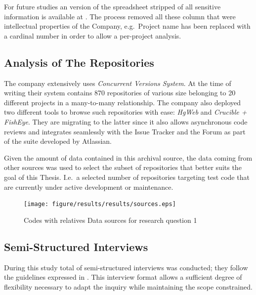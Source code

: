 


For future studies an version of the spreadsheet stripped of all sensitive information is available at . The process removed all these column that were intellectual properties of the Company, e.g.\ Project name has been replaced with a cardinal number in order to allow a per-project analysis.


\subsection{Analysis of The Repositories} \label{sec:analysis_of_the_repos}
The company extensively uses \textit{Concurrent Versions System}. At the time of writing their system contains 870 repositories of various size belonging to 20 different projects in a many-to-many relationship. The company also deployed two different tools to browse such repositories with ease: \textit{HgWeb} and \textit{Crucible + FishEye}. They are migrating to the latter since it also allows asynchronous code reviews and integrates seamlessly with the Issue Tracker and the Forum as part of the suite developed by Atlassian.

Given the amount of data contained in this archival source, the data coming from other sources was used to select the subset of repositories that better suits the goal of this Thesis. I.e.\ a selected number of repositories targeting test code that are currently under active development or maintenance.

\begin{figure}[!Htb]
    \centering
    \texttt{[image: figure/results/results/sources.eps]}
    \caption{Codes with relatives Data sources for research question 1}
    \label{fig:rq1_sources}
\end{figure}

\subsection{Semi-Structured Interviews} \label{sec:semi-structured_interviews}
During this study total of  semi-structured interviews was conducted; they follow the guidelines expressed in \cite{interview_guideline}. This interview format allows a sufficient degree of flexibility necessary to adapt the inquiry while maintaining the scope constrained.




